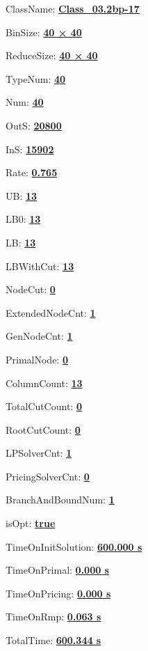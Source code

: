 \documentclass[11pt]{article}
\begin{document}
\pagestyle{empty}


ClassName: \underline{\textbf{Class_03.2bp-17}}
\par
BinSize: \underline{\textbf{40 × 40}}
\par
ReduceSize: \underline{\textbf{40 × 40}}
\par
TypeNum: \underline{\textbf{40}}
\par
Num: \underline{\textbf{40}}
\par
OutS: \underline{\textbf{20800}}
\par
InS: \underline{\textbf{15902}}
\par
Rate: \underline{\textbf{0.765}}
\par
UB: \underline{\textbf{13}}
\par
LB0: \underline{\textbf{13}}
\par
LB: \underline{\textbf{13}}
\par
LBWithCut: \underline{\textbf{13}}
\par
NodeCut: \underline{\textbf{0}}
\par
ExtendedNodeCnt: \underline{\textbf{1}}
\par
GenNodeCnt: \underline{\textbf{1}}
\par
PrimalNode: \underline{\textbf{0}}
\par
ColumnCount: \underline{\textbf{13}}
\par
TotalCutCount: \underline{\textbf{0}}
\par
RootCutCount: \underline{\textbf{0}}
\par
LPSolverCnt: \underline{\textbf{1}}
\par
PricingSolverCnt: \underline{\textbf{0}}
\par
BranchAndBoundNum: \underline{\textbf{1}}
\par
isOpt: \underline{\textbf{true}}
\par
TimeOnInitSolution: \underline{\textbf{600.000 s}}
\par
TimeOnPrimal: \underline{\textbf{0.000 s}}
\par
TimeOnPricing: \underline{\textbf{0.000 s}}
\par
TimeOnRmp: \underline{\textbf{0.063 s}}
\par
TotalTime: \underline{\textbf{600.344 s}}
\par
\newpage


\end{document}
